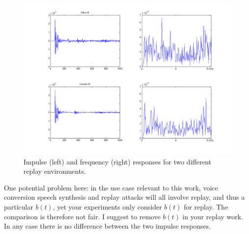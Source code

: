 \begin{figure}
	\centering
	\includegraphics[width=1\linewidth]{Figs/Room_IRs.png}
	\caption{Impulse (left) and frequency (right) responses for two different replay environments.}
	\label{fig::Room_IRs}
\end{figure}


One potential problem here: in the use case relevant to this work, voice conversion speech synthesis and replay attacks will all involve replay, and thus a particular $b(t)$, yet your experiments only consider $b(t)$ for replay.  The comparison is therefore not fair.  I suggest to remove $b(t)$ in your replay work.  In any case there is no difference between the two impulse responses.